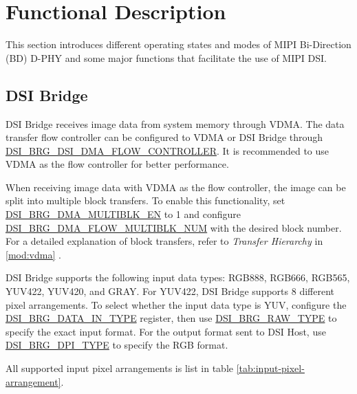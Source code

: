 \documentclass[main\_\_EN.tex]{subfiles}
\begin{document}

\section{Functional Description}
\label{sec:mipidsi-func-descr}
This section introduces different operating states and modes of MIPI Bi-Direction (BD) D-PHY and some major functions that facilitate the use of MIPI DSI.

\subsection{DSI Bridge}
\label{sec:dsi-bridge}

DSI Bridge receives image data from system memory through VDMA. The data transfer flow controller can be configured to VDMA or DSI Bridge through \hyperref[fielddesc:DSIBRGDSIDMAFLOWCONTROLLER]{DSI\_BRG\_DSI\_DMA\_FLOW\_CONTROLLER}. It is recommended to use VDMA as the flow controller for better performance.





When receiving image data with VDMA as the flow controller, the image can be split into multiple block transfers. To enable this functionality, set \hyperref[fielddesc:DSIBRGDMAMULTIBLKEN]{DSI\_BRG\_DMA\_MULTIBLK\_EN} to 1 and configure \hyperref[fielddesc:DSIBRGDMAFLOWMULTIBLKNUM]{DSI\_BRG\_DMA\_FLOW\_MULTIBLK\_NUM} with the desired block number. For a detailed explanation of block transfers, refer to \textit{Transfer Hierarchy} in \ref{mod:vdma} \textit{}.

DSI Bridge supports the following input data types: RGB888, RGB666, RGB565, YUV422, YUV420, and GRAY. For YUV422, DSI Bridge supports 8 different pixel arrangements. To select whether the input data type is YUV, configure the \hyperref[fielddesc:DSIBRGDATAINTYPE]{DSI\_BRG\_DATA\_IN\_TYPE} register, then use \hyperref[fielddesc:DSIBRGRAWTYPE]{DSI\_BRG\_RAW\_TYPE} to specify the exact input format. For the output format sent to DSI Host, use \hyperref[fielddesc:DSIBRGDPITYPE]{DSI\_BRG\_DPI\_TYPE} to specify the RGB format.

All supported input pixel arrangements is list in table \ref{tab:input-pixel-arrangement}.
\end{document}

